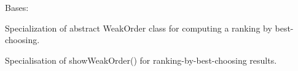 \documentclass[letterpaper,10pt,english]{sphinxmanual}
\begin{document}

\begin{fulllineitems}
\label{techDoc:weakOrders.RankingByBestChoosingDigraph}
Bases: {\hyperref[techDoc:weakOrders.RankingByChoosingDigraph]{}}

Specialization of abstract WeakOrder class for computing a ranking by best-choosing.

\begin{fulllineitems}
\label{techDoc:weakOrders.RankingByBestChoosingDigraph.showWeakOrder}
Specialisation of showWeakOrder() for ranking-by-best-choosing results.

\end{fulllineitems}


\end{fulllineitems}

\end{document}
